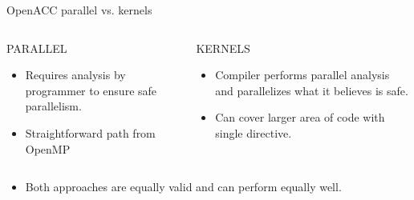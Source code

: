 \documentclass[10pt,t]{beamer}
\begin{document}
\begin{frame}{ OpenACC parallel vs. kernels}
  \begin{columns}
    \begin{block}{PARALLEL}
      \begin{itemize}
        \item Requires analysis by programmer to ensure safe parallelism.
        \item Straightforward path from OpenMP
      \end{itemize}
    \end{block}
    \begin{block}{KERNELS}
      \begin{itemize}
        \item Compiler performs parallel analysis and parallelizes what it believes is safe.
        \item Can cover larger area of code with single directive.
      \end{itemize}
    \end{block}
  \end{columns}
  \begin{itemize}
    \item[] Both approaches are equally valid and can perform equally well.
  \end{itemize}
\end{frame}

\begin{frame}[fragile]
  \begin{columns}[t]
     
     
  \end{columns}
\end{frame}
\end{document}
